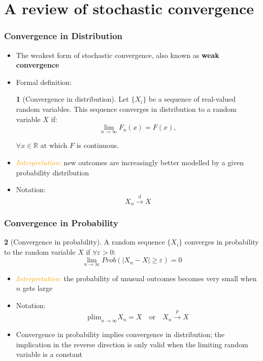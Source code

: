 \documentclass[10pt]{beamer}
\newcommand{\plim}{\mathrm{plim}}
\theoremstyle{definition}
\newtheorem{definition}{\translate{Definition}}
\begin{document}
\section{A review of stochastic convergence}
\begin{frame}[fragile]
\frametitle{Convergence in Distribution}
\begin{itemize}
	\item The weakest form of stochastic convergence, also known as \textbf{weak convergence}
	\item Formal definition:
	\begin{definition}[Convergence in distribution]
		Let $\{X_{i}\}$ be a sequence of real-valued random variables. This sequence converges in distribution to a random variable $X$ if:
		\[
			\lim_{n\to\infty} F_{n}(x) = F(x),
		\]
		
		$\forall x \in \mathbb{R}$ at which $F$ is continuous.
	\end{definition}
	\item \textcolor{orange}{\textit{Interpretation:}} new outcomes are increasingly better modelled by a given probability distribution
	\item Notation:
	\[
		X_{n} \overset{d}{\to} X
	\]
\end{itemize}
\end{frame}

\begin{frame}[fragile]
\frametitle{Convergence in Probability}
	\begin{definition}[Convergence in probability]
		A random sequence $\{X_{i}\}$ converges in probability to the random variable $X$ if $\forall \varepsilon > 0$:
		\[
			\lim_{n\to\infty} Prob(|X_{n} - X| \geq \varepsilon) = 0
		\]
	\end{definition}
	\begin{itemize}
		\item \textcolor{orange}{\textit{Interpretation:}} the probability of unusual outcomes becomes very small when $n$ gets large
		\item Notation:
		\[
			\plim_{n\to\infty} X_{n} = X \quad \textrm{or} \quad X_{n} \overset{p}{\to} X
		\]
		\item Convergence in probability implies convergence in distribution; the implication in the reverse direction is only valid when the limiting random variable is a constant
	\end{itemize}
\end{frame}
\end{document}

